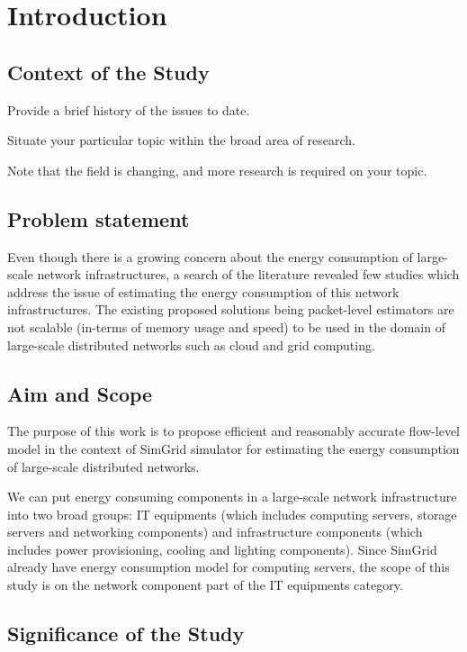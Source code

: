 \chapter{Introduction}
\label{chapter:intro}

\section{Context of the Study}	 
Provide a brief history of the issues to date.

Situate your particular topic within the broad area of research.

Note that the field is changing, and more research is required on your topic.
\section{Problem statement}
Even though there is a growing concern about the energy consumption of large-scale network infrastructures, a search of the literature revealed few studies which address the issue of estimating the energy consumption of this network infrastructures. The existing proposed solutions being packet-level estimators are not scalable (in-terms of memory usage and speed) to be used in the domain of large-scale distributed networks such as cloud and grid computing. 

\section{Aim and Scope}

The purpose of this work is to propose efficient and reasonably accurate flow-level model in the context of SimGrid simulator for estimating the energy consumption of large-scale distributed networks. 

We can put energy consuming components in a large-scale network infrastructure into two broad groups: IT equipments (which includes computing servers, storage servers and networking components) and infrastructure components (which includes power provisioning, cooling and lighting components). Since SimGrid already have energy consumption model for computing servers, the scope of this study is on the network component part of the IT equipments category.

\section{Significance of the Study}

